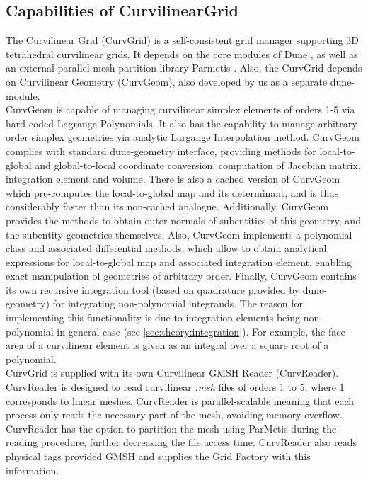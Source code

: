 \subsection{Capabilities of CurvilinearGrid}
\label{section-outline-capabilities}

The Curvilinear Grid (CurvGrid) is a self-consistent grid manager supporting 3D tetrahedral curvilinear grids. It depends on the core modules of Dune \citeDune{}, as well as an external parallel mesh partition library Parmetis \citeParMetis{}. Also, the CurvGrid depends on Curvilinear Geometry (CurvGeom), also developed by us as a separate dune-module. \\

\noindent
CurvGeom is capable of managing curvilinear simplex elements of orders 1-5 via hard-coded Lagrange Polynomials. It also has the capability to manage arbitrary order simplex geometries via analytic Largange Interpolation method. CurvGeom complies with standard dune-geometry interface, providing methods for local-to-global and global-to-local coordinate conversion, computation of Jacobian matrix, integration element and volume. There is also a cached version of CurvGeom which pre-computes the local-to-global map and its determinant, and is thus considerably faster than its non-cached analogue. Additionally, CurvGeom provides the methods to obtain outer normals of subentities of this geometry, and the subentity geometries themselves. Also, CurvGeom implements a polynomial class and associated differential methods, which allow to obtain analytical expressions for local-to-global map and associated integration element, enabling exact manipulation of geometries of arbitrary order. Finally, CurvGeom contains its own recursive integration tool (based on quadrature provided by dune-geometry) for integrating non-polynomial integrands. The reason for implementing this functionality is due to integration elements being non-polynomial in general case (see \cref{sec:theory:integration}). For example, the face area of a curvilinear element is given as an integral over a square root of a polynomial. \\

\noindent
CurvGrid is supplied with its own Curvilinear GMSH Reader (CurvReader). CurvReader is designed to read curvilinear \textit{.msh} files of orders 1 to 5, where 1 corresponds to linear meshes. CurvReader is parallel-scalable meaning that each process only reads the necessary part of the mesh, avoiding memory overflow. CurvReader has the option to partition the mesh using ParMetis during the reading procedure, further decreasing the file access time. CurvReader also reads physical tags provided GMSH and supplies the Grid Factory with this information. \\

